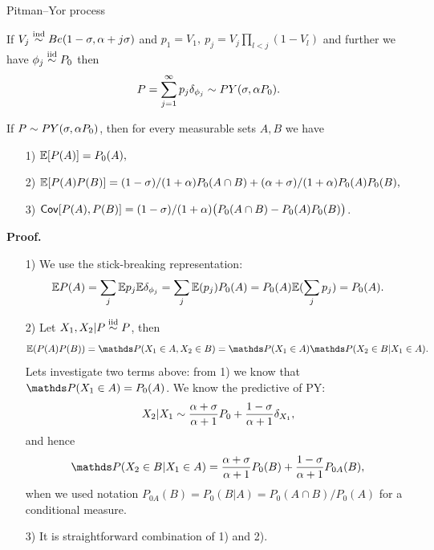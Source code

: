 \begin{frame}[allowframebreaks]{Pitman--Yor process}
\begin{theorem}
If $V_j\stackrel{\mbox{\scriptsize{ind}}}{\sim} Be(1-\sigma, \alpha + j\sigma)$ and $p_1=V_1,\ p_j=V_j\prod_{l<j}(1-V_l)$ and further we have $\phi_j\stackrel{\mbox{\scriptsize{iid}}}{\sim} P_0$ then 
$$
P=\sum_{j=1}^\infty p_j \delta_{\phi_j} \sim PY(\sigma,\alpha P_0).
$$
\end{theorem}

\framebreak


\begin{proposition}
[Moments of PY] If $P\sim PY(\sigma, \alpha P_0)$, then for every measurable sets $A,B$ we have
\begin{enumerate}
    \item[1)] $\mathbb{E} [P(A)] = P_0(A),$
    \item[2)] $\mathbb{E}[P(A)P(B)]=(1-\sigma)/(1+\alpha)P_0(A\cap B) + (\alpha + \sigma)/(1+ \alpha)P_0(A)P_0(B),$
    \item[3)] $\mathsf{Cov}[P(A),P(B)] = (1-\sigma)/(1+\alpha)\big(P_0(A\cap B) -P_0(A)P_0(B)\big)$.  
\end{enumerate}
\end{proposition}
\framebreak


\textbf{Proof.}
\begin{enumerate}
    \item[1)] We use the stick-breaking representation:
    \begin{equation*}
        \mathbb{E} P(A) =\sum_j \mathbb{E} p_j \mathbb{E}\delta_{\phi_j}=\sum_j \mathbb{E}(p_j) P_0(A) = P_0(A)\mathbb{E} (\sum_j p_j)= P_0(A).
    \end{equation*}
    \item[2)] Let $X_1, X_2|P \stackrel{\mbox{\scriptsize{iid}}}{\sim} P$, then
    \begin{equation*}
        \E(P(A)P(B)) = \P(X_1\in A, X_2\in B)=\P(X_1\in A)\P(X_2\in B|X_1\in A).
    \end{equation*}
    Lets investigate two terms above: from 1) we know that $\P(X_1\in A)=P_0(A)$. We know the predictive of PY:
    \begin{equation*}
        X_2|X_1 \sim \frac{\alpha + \sigma}{\alpha + 1}P_0+\frac{1-\sigma}{\alpha + 1}\delta_{X_1},
    \end{equation*}
    and hence
    \begin{equation*}
        \P(X_2\in B|X_1\in A) = \frac{\PrecisonParam + \sigma}{\PrecisonParam + 1}P_0(B) + \frac{1-\sigma}{\PrecisonParam + 1}P_{0A}(B),
    \end{equation*}
    when we used notation $P_{0A}(B)=P_0(B|A)=P_0(A\cap B)/P_0(A)$ for a conditional measure.
    \item[3)] It is straightforward combination of 1) and 2).
\end{enumerate}


\end{frame}

